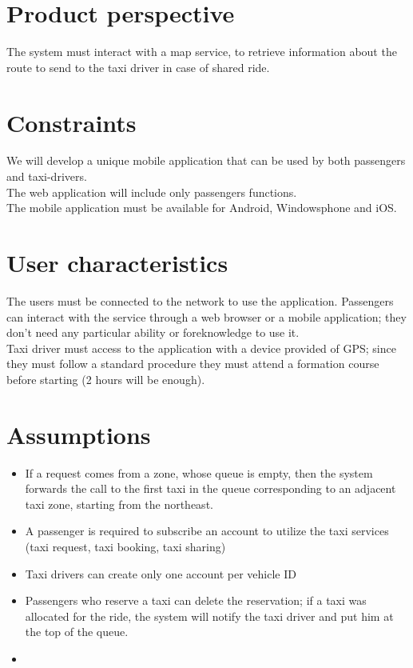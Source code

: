 \section{Product perspective}
The system must interact with a map service, to retrieve information about the route to send to the taxi driver in case of shared ride.


\section{Constraints}
We will develop a unique mobile application that can be used by both passengers and taxi-drivers.\\
The web application will include only passengers functions.\\
The mobile application must be available for Android, Windowsphone and iOS.\\


\section{User characteristics}
The users must be connected to the network to use the application.
Passengers can interact with the service through a web browser or a mobile application; they don't need any particular 
ability or foreknowledge to use it.\\
Taxi driver must access to the application with a device provided of GPS; since they must follow a standard procedure 
they must attend a formation course before starting (2 hours will be enough).\\


\section{Assumptions}
\begin{itemize}
  \item If a request comes from a zone, whose queue is empty, then the system forwards the call to the first taxi 
  in the queue corresponding to an adjacent taxi zone, starting from the northeast.
  \item A passenger is required to subscribe an account to utilize the taxi services (taxi request, taxi booking, taxi sharing)
  \item Taxi drivers can create only one account per vehicle ID
  \item Passengers who reserve a taxi can delete the reservation; if a taxi was allocated for the ride, 
  the system will notify the taxi driver and put him at the top of the queue.
  \item
\end{itemize} 

